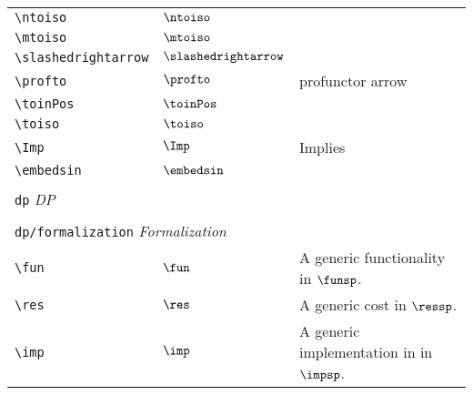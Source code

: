\begin{longtable}{lll}
  {\color[rgb]{0.5,0.5,0.5}\texttt{\textbackslash ntoiso}}                                                  & $\ntoiso$                  & \\
  {\color[rgb]{0.5,0.5,0.5}\texttt{\textbackslash mtoiso}}                                                  & $\mtoiso$                  & \\
  {\color[rgb]{0.5,0.5,0.5}\texttt{\textbackslash slashedrightarrow}}                                       & $\slashedrightarrow$
  & \\
  {\color[rgb]{0.5,0.5,0.5}\texttt{\textbackslash profto}}                                                  & $\profto$                  & profunctor arrow\\
  {\color[rgb]{0.5,0.5,0.5}\texttt{\textbackslash toinPos}}                                                 & $\toinPos$                 & \\
  {\color[rgb]{0.5,0.5,0.5}\texttt{\textbackslash toiso}}                                                   & $\toiso$                   & \\
  {\color[rgb]{0.5,0.5,0.5}\texttt{\textbackslash Imp}}                                                     & $\Imp$                     & Implies\\
  {\color[rgb]{0.5,0.5,0.5}\texttt{\textbackslash embedsin}}                                                & $\embedsin$                &                                                         \\
  &                            &                                                         \\
  \multicolumn{3}{l}{{\color[rgb]{0.5,0.5,0.5}\texttt{dp}} \emph{DP}} \\
  \hline
  \hline
  &                            &                                                         \\
  \multicolumn{3}{l}{{\color[rgb]{0.5,0.5,0.5}\texttt{dp/formalization}} \emph{Formalization}}
  \\
  \hline
  {\color[rgb]{0.5,0.5,0.5}\texttt{\textbackslash fun}}                                                     & $\fun$                     & A generic functionality in $\funsp$.\\
  {\color[rgb]{0.5,0.5,0.5}\texttt{\textbackslash res}}                                                     & $\res$                     & A generic cost in $\ressp$.\\
  {\color[rgb]{0.5,0.5,0.5}\texttt{\textbackslash imp}}                                                     & $\imp$                     & A generic implementation in in $\impsp$.\\

\end{longtable}
